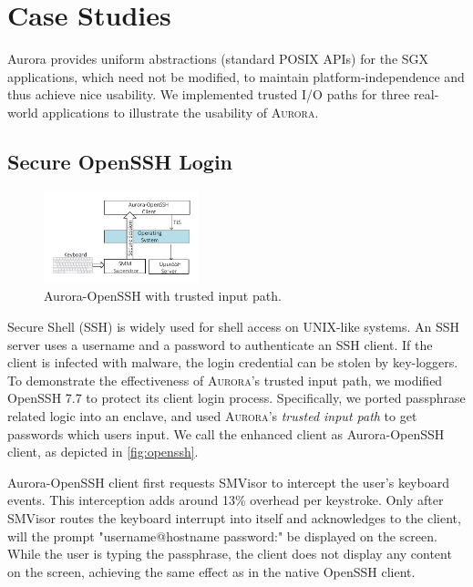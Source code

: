 \section{Case Studies}\label{casestudy}

Aurora provides uniform abstractions (standard POSIX APIs) for the SGX applications, which need not be modified, to maintain platform-independence and thus achieve nice usability. We implemented trusted I/O paths for three real-world applications to illustrate the usability of \textsc{Aurora}.

\subsection{Secure OpenSSH Login}\label{openssh}

\begin{figure}[t]
	\centering
	\includegraphics[width=0.4\textwidth]{figures/ssh.pdf} %
	\caption{Aurora-OpenSSH with trusted input path.}
	\label{fig:openssh}
\end{figure}

Secure Shell (SSH) is widely used for shell access on UNIX-like systems. An SSH server uses a username and a password to authenticate an SSH client. If the client is infected with malware, the login credential can be stolen by key-loggers. To demonstrate the effectiveness of \textsc{Aurora}'s trusted input path, we modified OpenSSH 7.7 to protect its client login process. Specifically, we ported passphrase related logic into an enclave, and used \textsc{Aurora}'s \textit{trusted input path} to get passwords which users input. We call the enhanced client as Aurora-OpenSSH client, as depicted in \autoref{fig:openssh}.

Aurora-OpenSSH client first requests SMVisor to intercept the user's  keyboard events. This interception adds around 13\% overhead per keystroke. Only after SMVisor routes the keyboard interrupt into itself and acknowledges to the client, will the prompt \textsf{"username@hostname password:"}  be displayed on the screen. While the user is typing the passphrase, the client does not display any content on the screen, achieving the same effect as in the native OpenSSH client.


